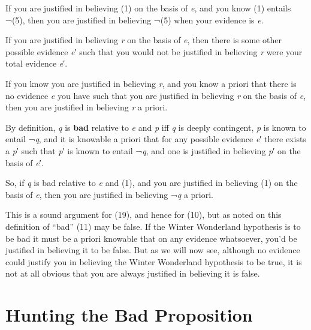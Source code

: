 \documentclass[
  11pt,
  letterpaper,
  DIV=11,
  numbers=noendperiod,
  twoside]{scrartcl}
\providecommand{\tightlist}{%
  \setlength{\itemsep}{0pt}\setlength{\parskip}{0pt}}
\begin{document}
\begin{description}
\tightlist
\item[(12)]
If you are justified in believing (1) on the basis of \emph{e}, and you
know (1) entails ¬(5), then you are justified in believing ¬(5) when
your evidence is \emph{e}.
\item[(13)]
If you are justified in believing \emph{r} on the basis of \emph{e},
then there is some other possible evidence \emph{e}′ such that you would
not be justified in believing \emph{r} were your total evidence
\emph{e}′.
\item[(17)]
If you know you are justified in believing \emph{r}, and you know a
priori that there is no evidence \emph{e} you have such that you are
justified in believing \emph{r} on the basis of \emph{e}, then you are
justified in believing \emph{r} a priori.
\item[(18)]
By definition, \emph{q} is \textbf{bad} relative to \emph{e} and
\emph{p} iff \emph{q} is deeply contingent, \emph{p} is known to entail
¬\emph{q}, and it is knowable a priori that for any possible evidence
\emph{e}′ there exists a \emph{p}′ such that \emph{p}′ is known to
entail ¬\emph{q}, and one is justified in believing \emph{p}′ on the
basis of \emph{e}′.
\item[(19)]
So, if \emph{q} is bad relative to \emph{e} and (1), and you are
justified in believing (1) on the basis of \emph{e}, then you are
justified in believing ¬\emph{q} a priori.
\end{description}

This is a sound argument for (19), and hence for (10), but as noted on
this definition of ``bad'' (11) may be false. If the Winter Wonderland
hypothesis is to be bad it must be a priori knowable that on any
evidence whatsoever, you'd be justified in believing it to be false. But
as we will now see, although no evidence could justify you in believing
the Winter Wonderland hypothesis to be true, it is not at all obvious
that you are always justified in believing it is false.

\section{Hunting the Bad Proposition}\label{hunting-the-bad-proposition}
\end{document}
